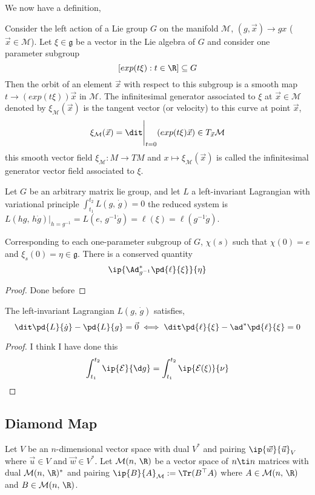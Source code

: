 We now have a definition,
\begin{ndefi}
  Consider the left action of a Lie group $G$ on the manifold $\mathcal{M}$, $(g, \vec x) \to gx$ ($\vec x \in \mathcal{M}$). Let $\xi \in \mathfrak{g}$ be a vector in the Lie algebra of $G$ and consider one parameter subgroup $$[exp(t\xi) : t \in \R] \subseteq G$$
  Then the orbit of an element $\vec x$ with respect to this subgroup is a smooth map $t \to (exp(t\xi))\vec x$ in $\mathcal{M}$. The infinitesimal generator associated to $\xi$ at $\vec x \in \mathcal{M}$ denoted by $\xi_{\mathcal{M}}(\vec x)$ is the tangent vector (or velocity) to this curve at point $\vec x$,
  $$ \xi_{\mathcal{M}} (\vec x) = \dit\Bigg|_{t=0} (exp(t \xi)\vec x) \in T_{\vec x}\mathcal{M} $$
  this smooth vector field $\xi_{\mathcal{M}} : M \to TM$ and $x \mapsto \xi_{\mathcal{M}}(\vec x)$ is called the infinitesimal generator vector field associated to $\xi$.
\end{ndefi}

Let $G$ be an arbitrary matrix lie group, and let $L$ a left-invariant Lagrangian with variational principle $\int_{t_1}^{t_2} L(g,\,\dot g) = 0$ the reduced system is $L(hg,\, h\dot g)|_{h = g^{-1}} = L(e,\,g^{-1}\dot g) = \ell(\xi) = \ell(g^{-1}\dot g)$.
\begin{nthm}
  Corresponding to each one-parameter subgroup of $G$, $\chi(s)$ such that $\chi(0) = e$ and $\xi_s(0) = \eta \in \mathfrak{g}$. There is a conserved quantity
  $$ \ip{\Ad^*_{g^{-1}} \pd{\ell}{\xi}}{\eta} $$
\end{nthm}
\begin{proof}
  Done before
\end{proof}

\begin{nprop}
  The left-invariant Lagrangian $L(g,\,\dot g)$ satisfies,
  $$ \dit\pd{L}{\dot g} - \pd{L}{g} = \vec 0  \iff \dit\pd{\ell}{\xi} - \ad^*\pd{\ell}{\xi} = 0$$
\end{nprop}
\begin{proof}
  I think I have done this
  $$ \int_{t_1}^{t_2} \ip{\mathcal{E}}{\d g} = \int_{t_1}^{t_2} \ip{\mathcal{E}(\xi)}{\nu} $$
\end{proof}

\subsection{Diamond Map}
Let $V$ be an $n$-dimensional vector space with dual $V^*$ and pairing $\ip{\vec w}{\vec u}_V$ where $\vec u \in V$ and $\vec w \in V^*$. Let $\mathcal{M}(n,\,\R)$ be a vector space of $n \ti n$ matrices with dual $\mathcal{M}(n,\,\R)^*$ and pairing $\ip{B}{A}_{\mathcal{M}} := \Tr(B^\top A)$ where $A \in \mathcal{M}(n,\,\R)$ and $B \in \mathcal{M}(n,\,\R)$.\\

